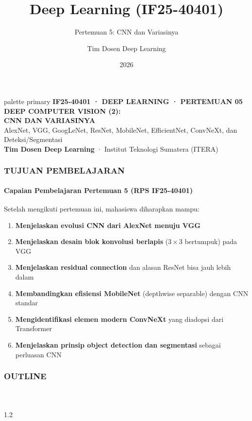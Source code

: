 \documentclass[t,aspectratio=169,xcolor=dvipsnames]{beamer}
\title[Pertemuan 5: CNN dan Variasinya]{Deep Learning (IF25-40401)}
\subtitle{Pertemuan 5: CNN dan Variasinya}
\author{Tim Dosen Deep Learning}
\institute{Teknik Informatika — Institut Teknologi Sumatera (ITERA)}
\date{2026}
\begin{document}
\begin{frame}[plain]
  \begin{beamercolorbox}[wd=\paperwidth,ht=\paperheight,sep=1.5cm]{palette primary}
    \vspace{0.8cm}
    {\scriptsize\bfseries\color{dlMute}IF25-40401 · DEEP LEARNING · PERTEMUAN 05}\\[0.4cm]
    {\Huge\bfseries DEEP COMPUTER VISION (2):\\CNN DAN VARIASINYA}\\[0.4cm]
    {\small AlexNet, VGG, GoogLeNet, ResNet, MobileNet, EfficientNet, ConvNeXt, dan Deteksi/Segmentasi}\\[1.0cm]
    \vfill
    {\scriptsize\textbf{Tim Dosen Deep Learning} · Institut Teknologi Sumatera (ITERA)}
  \end{beamercolorbox}
\end{frame}

\begin{frame}[plain]
    \frametitle{TUJUAN PEMBELAJARAN}
    \framesubtitle{Capaian Pembelajaran Pertemuan 5 (RPS IF25-40401)}

    \begin{exampleblock}{Setelah mengikuti pertemuan ini, mahasiswa diharapkan mampu:}
        \begin{enumerate}
            \item \textbf{Menjelaskan evolusi CNN dari AlexNet menuju VGG}
            \item \textbf{Menjelaskan desain blok konvolusi berlapis} ($3\times3$ bertumpuk) pada VGG
            \item \textbf{Menjelaskan residual connection} dan alasan ResNet bisa jauh lebih dalam
            \item \textbf{Membandingkan efisiensi MobileNet} (depthwise separable) dengan CNN standar
            \item \textbf{Mengidentifikasi elemen modern ConvNeXt} yang diadopsi dari Transformer
            \item \textbf{Menjelaskan prinsip object detection dan segmentasi} sebagai perluasan CNN
        \end{enumerate}
    \end{exampleblock}
\end{frame}

\begin{frame}[plain]
    \frametitle{OUTLINE}
    \framesubtitle{~}
    \begin{spacing}{1.2}
        \tableofcontents
    \end{spacing}
\end{frame}
\end{document}
